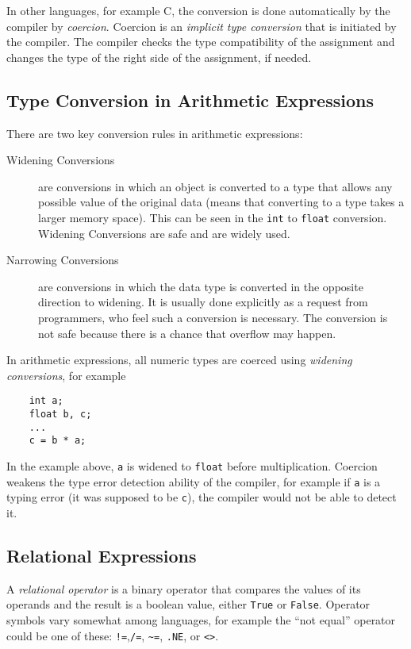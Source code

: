 In other languages, for example C, the conversion is done automatically by the compiler by \textit{coercion}. Coercion is an \textit{implicit type conversion} that is initiated by the compiler. The compiler checks the type compatibility of the assignment and changes the type of the right side of the assignment, if needed.

\subsection{Type Conversion in Arithmetic Expressions}
There are two key conversion rules in arithmetic expressions:
\begin{description}
    \item[Widening Conversions] are conversions in which an object is converted to a type that allows any possible value of the original data (means that converting to a type takes a larger memory space). This can be seen in the \verb|int| to \verb|float| conversion. Widening Conversions are safe and are widely used.
    \item[Narrowing Conversions] are conversions in which the data type is converted in the opposite direction to widening. It is usually done explicitly as a request from programmers, who feel such a conversion is necessary. The conversion is not safe because there is a chance that overflow may happen.  
\end{description}

In arithmetic expressions, all numeric types are coerced using \textit{widening conversions}, for example 
\begin{verbatim}
    int a;
    float b, c;
    ...
    c = b * a;
\end{verbatim}
In the example above, \verb|a| is widened to \verb|float| before multiplication. Coercion weakens the type error detection ability of the compiler, for example if \verb|a| is a typing error (it was supposed to be \verb|c|), the compiler would not be able to detect it.

\subsection{Relational Expressions}
A \textit{relational operator} is a binary operator that compares the values of its operands and the result is a boolean value, either \verb|True| or \verb|False|. Operator symbols vary somewhat among languages, for example the ``not equal'' operator could be one of these: \verb|!=|,\verb|/=|, \verb|~=|, \verb|.NE|, or \verb|<>|.\\

